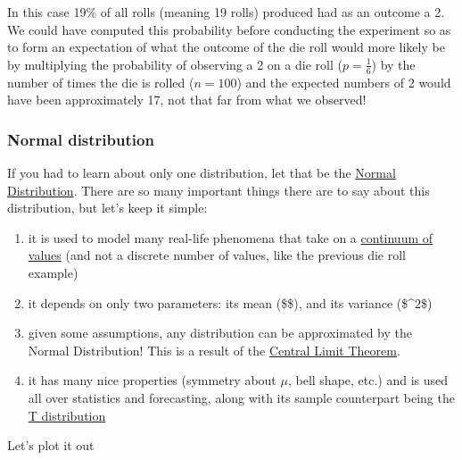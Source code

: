 \documentclass[
  letterpaper,
  DIV=11,
  numbers=noendperiod]{scrartcl}
\providecommand{\tightlist}{%
  \setlength{\itemsep}{0pt}\setlength{\parskip}{0pt}}\usepackage{longtable,booktabs,array}
\begin{document}
In this case 19\% of all rolls (meaning 19 rolls) produced had as an
outcome a 2. We could have computed this probability before conducting
the experiment so as to form an expectation of what the outcome of the
die roll would more likely be by multiplying the probability of
observing a 2 on a die roll (\(p=\frac{1}{6}\)) by the number of times
the die is rolled (\(n=100\)) and the expected numbers of 2 would have
been approximately 17, not that far from what we observed!

\subsubsection{Normal distribution}\label{normal-distribution}

If you had to learn about only one distribution, let that be the
\href{https://www.investopedia.com/terms/n/normaldistribution.asp\#:~:text=The\%20Bottom\%20Line-,Normal\%20distribution\%2C\%20also\%20known\%20as\%20the\%20Gaussian\%20distribution\%2C\%20is\%20a,defined\%20by\%20the\%20standard\%20deviation.}{Normal
Distribution}. There are so many important things there are to say about
this distribution, but let's keep it simple:

\begin{enumerate}
\def\labelenumi{\arabic{enumi}.}
\tightlist
\item
  it is used to model many real-life phenomena that take on a
  \href{https://www.google.com/url?sa=t&source=web&rct=j&opi=89978449&url=https://www.youtube.com/watch\%3Fv\%3DQxqxdQ_g2uw&ved=2ahUKEwithPq87daJAxVr_7sIHWqJG7QQwqsBegQIMRAF&usg=AOvVaw0dJpzZRYGkC9qx1omRy_Xa}{continuum
  of values} (and not a discrete number of values, like the previous die
  roll example)
\item
  it depends on only two parameters: its mean (\$\mu\$), and its
  variance (\$\sigma\^{}2\$)
\item
  given some assumptions, any distribution can be approximated by the
  Normal Distribution! This is a result of the
  \href{https://www.investopedia.com/terms/c/central_limit_theorem.asp}{Central
  Limit Theorem}.
\item
  it has many nice properties (symmetry about \(\mu\), bell shape, etc.)
  and is used all over statistics and forecasting, along with its sample
  counterpart being the
  \href{https://www.investopedia.com/terms/t/tdistribution.asp}{T
  distribution}
\end{enumerate}

Let's plot it out
\end{document}
